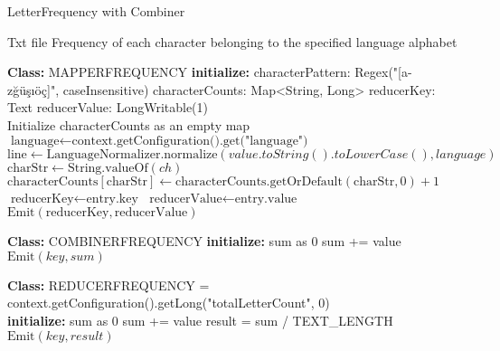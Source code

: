 \begin{algorithm}
    \caption{LetterFrequency with Combiner}
    \begin{algorithmic}[1]
    \Require Txt file
    \Ensure Frequency of each character belonging to the specified language alphabet
    \\
    \Statex
    
    \textbf{Class:} MAPPERFREQUENCY
    \State \textbf{initialize:}
    \State  characterPattern: Regex("[a-zğüşıöç]", caseInsensitive)
    \State  characterCounts: Map<String, Long>
    \State  reducerKey: Text
    \State  reducerValue: LongWritable(1) \\
    
        \State Initialize characterCounts as an empty map
    \EndProcedure\\
    
        \State $\text{language} \gets \text{context.getConfiguration().get("language")}$ 
        \State $\text{line} \gets \text{LanguageNormalizer.normalize}(value.toString().toLowerCase(), language)$
                \State $\text{charStr} \gets \text{String.valueOf}(ch)$
                \State $\text{characterCounts}[\text{charStr}] \gets \text{characterCounts.getOrDefault}(\text{charStr}, 0) + 1$
            \EndIf
        \EndFor
    \EndProcedure\\
    
            \State $\text{reducerKey} \gets \text{entry.key}$
            \State $\text{reducerValue} \gets \text{entry.value}$
            \State $\text{Emit}(\text{reducerKey}, \text{reducerValue})$
        \EndFor
    \EndProcedure\\
    
    \Statex
    
    \textbf{Class:} COMBINERFREQUENCY
        \State \textbf{initialize:} sum as 0
            \State sum += value
        \EndFor
        \State $\text{Emit}(key, sum)$
    \EndProcedure\\
    
    \Statex
    
    \textbf{Class:} REDUCERFREQUENCY
        \State {} = context.getConfiguration().getLong("totalLetterCount", 0)
    \EndProcedure\\
    
        \State \textbf{initialize:} sum as 0
            \State sum += value
        \EndFor
        \State result = sum / TEXT\_LENGTH
        \State $\text{Emit}(key, result)$
    \EndProcedure
    
    \end{algorithmic}
    \end{algorithm}


